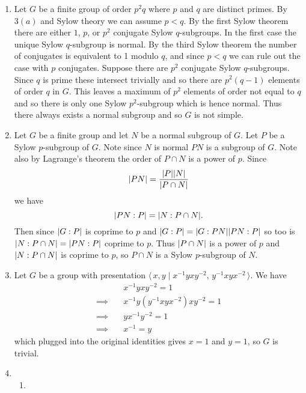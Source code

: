 \documentclass[a4paper, 12pt]{article}
\DeclarePairedDelimiter\abs{\lvert}{\rvert}
\begin{document}
\begin{enumerate}
\begin{enumerate}
\end{enumerate}

\item Let \(G\) be a finite group of order \(p^2q\) where \(p\) and \(q\) are distinct primes. By \(3(a)\) and Sylow theory we can assume \(p<q\). By the first Sylow theorem there are either \(1\), \(p\), or \(p^2\) conjugate Sylow \(q\)-subgroups. In the first case the unique Sylow \(q\)-subgroup is normal. By the third Sylow theorem the number of conjugates is equivalent to 1 modulo \(q\), and since \(p<q\) we can rule out the case with \(p\) conjugates. Suppose there are \(p^2\) conjugate Sylow \(q\)-subgroups. Since \(q\) is prime these intersect trivially and so there are \(p^2(q-1)\) elements of order \(q\) in \(G\). This leaves a maximum of \(p^2\) elements of order not equal to \(q\) and so there is only one Sylow \(p^2\)-subgroup which is hence normal. Thus there always exists a normal subgroup and so \(G\) is not simple.

\item Let \(G\) be a finite group and let \(N\) be a normal subgroup of \(G\). Let \(P\) be a Sylow \(p\)-subgroup of \(G\). Note since \(N\) is normal \(PN\) is a subgroup of \(G\). Note also by Lagrange's theorem the order of \(P\cap N\) is a power of \(p\). Since
\[\abs{PN}=\frac{\abs P\abs N}{\abs{P\cap N}}\]
we have
\[\abs{PN:P}=\abs{N:P\cap N}.\]
Then since \(\abs{G:P}\) is coprime to \(p\) and \(\abs{G:P}=\abs{G:PN}\abs{PN:P}\) so too is \(\abs{N:P\cap N}=\abs{PN:P}\) coprime to \(p\). Thus \(\abs{P\cap N}\) is a power of \(p\) and \(\abs{N:P\cap N}\) is coprime to \(p\), so \(P\cap N\) is a Sylow \(p\)-subgroup of \(N\).

\item Let \(G\) be a group with presentation \(\langle\,x,y\mid x^{-1}yxy^{-2},\,y^{-1}xyx^{-2}\,\rangle\). We have
\begin{align*}
&x^{-1}yxy^{-2}=1\\
\implies\quad&x^{-1}y(y^{-1}xyx^{-2})xy^{-2}=1\\
\implies\quad&yx^{-1}y^{-2}=1\\
\implies\quad&x^{-1}=y
\end{align*}
which plugged into the original identities gives \(x=1\) and \(y=1\), so \(G\) is trivial.

\item \begin{enumerate}

\item


\end{enumerate}
\end{enumerate}
\end{document}
